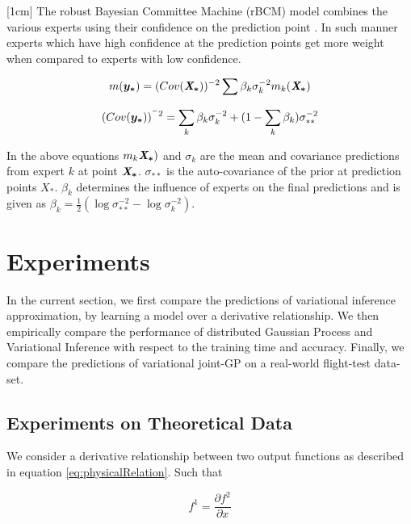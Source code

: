 [1cm]
The robust Bayesian Committee Machine (rBCM) model combines the various experts using their confidence on the prediction point \cite{deisenroth2015distributed}. In such manner experts which have high confidence at the prediction points get more weight when compared to experts with low confidence. 

\begin{equation}\label{eq:meanDGP}
    m(\boldsymbol{y_{*}}) = (Cov(\bm{\mathit{X_{*}}}))^{-2}\sum \beta_{k}\sigma_{k}^{-2}m_{k}(\bm{\mathit{X_{*}}})
\end{equation}

\begin{equation}
    (Cov(\boldsymbol{y_{*}}))^{^-2} = \sum_{k} \beta_{k}\sigma_{k}^{-2} + (1- \sum_{k} \beta_{k})\sigma^{-2}_{**}
\end{equation}

In the above equations \(m_{k}\bm{\mathit{X_{*}}})\) and \(\sigma_{k}\) are the mean and covariance predictions from expert \(k\) at point \(\bm{\mathit{X_{*}}}\). \(\sigma_{**}\) is the auto-covariance of the prior at prediction points \(X_{*}\). \(\beta_{k}\) determines the influence of experts on the final predictions \cite{caoF14} and is given as \(\beta_{k} = \frac{1}{2}(\log\sigma_{**}^{-2} - \log\sigma_{k}^{-2})\).  

\section{Experiments}\label{sec:experiments}
In the current section, we first compare the predictions of variational inference approximation, by learning a model over a derivative relationship. We then empirically compare the performance of distributed Gaussian Process and Variational Inference with respect to the training time and accuracy. Finally, we compare the predictions of variational joint-GP on a real-world flight-test data-set. 

\subsection{Experiments on Theoretical Data}\label{sub:ScaleexperimentsSyntheticData}
We consider a derivative relationship between two output functions as described in equation \ref{eq:physicalRelation}. Such that 

\begin{equation}\label{eq:derivativeEquation}
   f^1 = \frac{\partial f^2}{\partial x} 
\end{equation}

